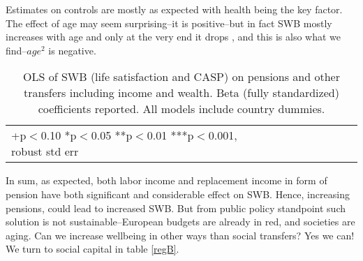 \documentclass[10pt, letterpaper]{article}
\begin{document}
\begin{spacing}{1.4}
Estimates on controls are mostly as expected with health being the key
factor. The effect of age may seem surprising--it is  positive--but in fact SWB mostly
increases with age and only at the very end it drops \citep{gwozdz10}, and this
is also what we find--$age^2$ is negative.


\begin{spacing}{.9}
\begin{table}[H]\centering \caption{OLS of SWB (life satisfaction and CASP) on pensions and
    other transfers including income and wealth. Beta (fully standardized)
    coefficients reported. All models
    include country dummies.}  \begin{scriptsize} \begin{tabular}{p{1.8in}p{.5in}p{.5in}p{.5in}p{.5in}|p{.5in}p{.5in}p{.5in}p{.5in}p{.5in}p{.4in}p{.5in}p{.4in}}\hline 
      \hline\multicolumn{5}{l}{+p$<$0.10 *p$<$0.05 **p$<$0.01 ***p$<$0.001,
        robust std err} \end{tabular}\label{regA} \end{scriptsize}\end{table}
\end{spacing}


In sum, as expected, both labor income and replacement income in form of pension
have both significant and considerable effect on SWB. Hence, increasing
pensions, could lead to increased SWB. But from public policy standpoint such
solution is not sustainable--European budgets are already in red,  and societies are
aging. Can we increase wellbeing in other ways than social transfers? Yes we
can! We turn to social capital in table \ref{regB}.


\end{spacing}
\end{document}
